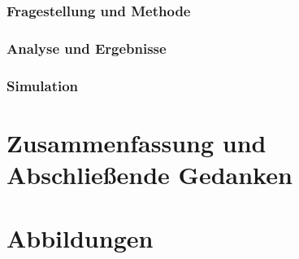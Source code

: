 \documentclass[openany,twoside,twocolumn]{book}
\let\pby\printbibliography
\renewcommand{\printbibliography}{}
\begin{document}
\hypertarget{fragestellung-und-methode-1}{%
\subsection{Fragestellung und
Methode}\label{fragestellung-und-methode-1}}

\hypertarget{analyse-und-ergebnisse-1}{%
\subsection{Analyse und Ergebnisse}\label{analyse-und-ergebnisse-1}}

\hypertarget{simulation-2}{%
\subsection{Simulation}\label{simulation-2}}

\newpage
\pby[title={Literatur},segment=\therefsegment,heading=subbibintoc]

\hypertarget{zusammenfassung-und-abschlieende-gedanken}{%
\chapter{Zusammenfassung und Abschließende
Gedanken}\label{zusammenfassung-und-abschlieende-gedanken}}

\hypertarget{abbildungen}{%
\chapter{Abbildungen}\label{abbildungen}}

\printbibliography
\end{document}
